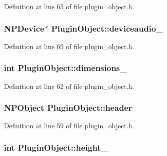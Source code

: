 Definition at line 65 of file plugin\_\-object.h.

\hypertarget{class_plugin_object_aec43fcb4f77ce50598bb1851b100d045}{
\subsubsection[{deviceaudio\_\-}]{\setlength{\rightskip}{0pt plus 5cm}NPDevice$\ast$ {\bf PluginObject::deviceaudio\_\-}}}
\label{class_plugin_object_aec43fcb4f77ce50598bb1851b100d045}


Definition at line 69 of file plugin\_\-object.h.

\hypertarget{class_plugin_object_a60f6c920af50735f647d1715d7a27384}{
\subsubsection[{dimensions\_\-}]{\setlength{\rightskip}{0pt plus 5cm}int {\bf PluginObject::dimensions\_\-}}}
\label{class_plugin_object_a60f6c920af50735f647d1715d7a27384}


Definition at line 62 of file plugin\_\-object.h.

\hypertarget{class_plugin_object_a2d49cd1ca32c2522400d2505bd3e357e}{
\subsubsection[{header\_\-}]{\setlength{\rightskip}{0pt plus 5cm}NPObject {\bf PluginObject::header\_\-}}}
\label{class_plugin_object_a2d49cd1ca32c2522400d2505bd3e357e}


Definition at line 59 of file plugin\_\-object.h.

\hypertarget{class_plugin_object_af5872be14fbb29cf6cdf6df495766dd1}{
\subsubsection[{height\_\-}]{\setlength{\rightskip}{0pt plus 5cm}int {\bf PluginObject::height\_\-}}}
\label{class_plugin_object_af5872be14fbb29cf6cdf6df495766dd1}


